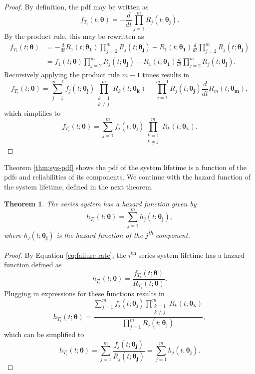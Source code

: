 \documentclass[
]{article}
\theoremstyle{definition}
\theoremstyle{plain}
\newtheorem{theorem}{Theorem}[section]
\theoremstyle{definition}
\theoremstyle{definition}
\theoremstyle{definition}
\theoremstyle{definition}
\theoremstyle{remark}
\begin{document}
\begin{proof}
By definition, the pdf may be written as
\[
    f_{T_i}(t;\boldsymbol{\theta}) = -\frac{d}{dt} \prod_{j=1}^m R_j(t;\boldsymbol{\theta_j}).
\]
By the product rule, this may be rewritten as
\begin{align*}
  f_{T_i}(t;\boldsymbol{\theta})
    &= -\frac{d}{dt} R_1(t;\boldsymbol{\theta_1})\prod_{j=2}^m R_j(t;\boldsymbol{\theta_j}) -
      R_1(t;\boldsymbol{\theta_1}) \frac{d}{dt} \prod_{j=2}^m R_j(t;\boldsymbol{\theta_j})\\
    &= f_1(t;\boldsymbol{\theta}) \prod_{j=2}^m R_j(t;\boldsymbol{\theta_j}) -
      R_1(t;\boldsymbol{\theta_1}) \frac{d}{dt} \prod_{j=2}^m R_j(t;\boldsymbol{\theta_j}).
\end{align*}
Recursively applying the product rule \(m-1\) times results in
\[
f_{T_i}(t;\boldsymbol{\theta}) = \sum_{j=1}^{m-1} f_j(t;\boldsymbol{\theta_j})
    \prod_{\substack{k=1\\k \neq j}}^m R_k(t;\boldsymbol{\theta_k}) -
    \prod_{j=1}^{m-1} R_j(t;\boldsymbol{\theta_j}) \frac{d}{dt} R_m(t;\boldsymbol{\theta_m}),
\]
which simplifies to
\[
f_{T_i}(t;\boldsymbol{\theta})= \sum_{j=1}^m f_j(t;\boldsymbol{\theta_j})
    \prod_{\substack{k=1\\k \neq j}}^m R_k(t;\boldsymbol{\theta_k}).
\]
\end{proof}

Theorem \ref{thm:sys-pdf} shows the pdf of the system lifetime is a function of
the pdfs and reliabilities of its components. We continue with the hazard
function of the system lifetime, defined in the next theorem.

\begin{theorem}
\protect\hypertarget{thm:sys-failure-rate}{}\label{thm:sys-failure-rate}The series system has a hazard function given by
\begin{equation}
\label{eq:sys-failure-rate}
h_{T_i}(t;\boldsymbol{\theta}) = \sum_{j=1}^m h_j(t;\boldsymbol{\theta_j}), 
\end{equation}
where \(h_j(t;\boldsymbol{\theta_j})\) is the hazard function of the \(j\)\textsuperscript{th} component.
\end{theorem}

\begin{proof}
By Equation \eqref{eq:failure-rate}, the \(i\)\textsuperscript{th} series system
lifetime has a hazard function defined as
\[
  h_{T_i}(t;\boldsymbol{\theta}) = \frac{f_{T_i}(t;\boldsymbol{\theta})}{R_{T_i}(t;\boldsymbol{\theta})}.
\]
Plugging in expressions for these functions results in
\[
  h_{T_i}(t;\boldsymbol{\theta}) = \frac{\sum_{j=1}^m f_j(t;\boldsymbol{\theta_j})
    \prod_{\substack{k=1\\k \neq j}}^m R_k(t;\boldsymbol{\theta_k})}
      {\prod_{j=1}^m R_j(t;\boldsymbol{\theta_j})},
\]
which can be simplified to
\[
h_{T_i}(t;\boldsymbol{\theta})
  = \sum_{j=1}^m \frac{f_j(t;\boldsymbol{\theta_j})}{R_j(t;\boldsymbol{\theta_j})}
  = \sum_{j=1}^m h_j(t;\boldsymbol{\theta_j}).
\]
\end{proof}
\end{document}
